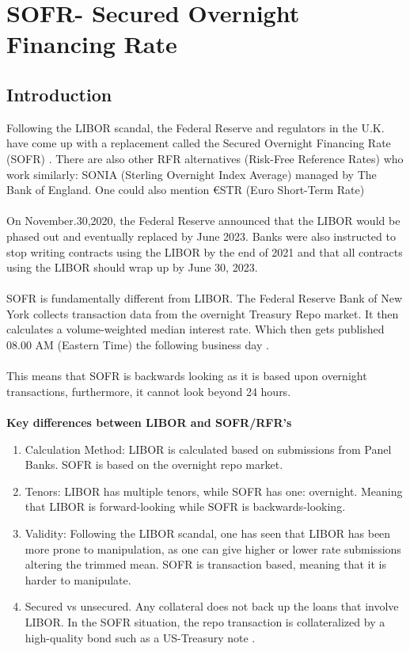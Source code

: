 \chapter{SOFR- Secured Overnight Financing Rate}
\label{chp_SOFR}

\section{Introduction}
Following the LIBOR scandal, the Federal Reserve and regulators in the U.K. have come up with a replacement called the Secured Overnight Financing Rate (SOFR) .
There are also other RFR alternatives (Risk-Free Reference Rates)  who work similarly: SONIA (Sterling Overnight Index Average) 
 managed by The Bank of England. One could also mention €STR (Euro Short-Term Rate) 
\cite{CME_SOFR}
\\~\\
On November.30,2020, the Federal Reserve announced that the LIBOR would be phased out and eventually replaced by June 2023. Banks were also instructed to stop writing contracts using the LIBOR by the end of 2021 and that all contracts using the LIBOR should wrap up by June 30, 2023. \cite{hayes_2022}
\\~\\ 
SOFR is fundamentally different from LIBOR. The Federal Reserve Bank of New York collects transaction data from the overnight Treasury Repo market. It then calculates a volume-weighted median interest rate. Which then gets published 08.00 AM (Eastern Time) the following business day \cite{ARRC_SOFR}.
\\~\\ 
This means that SOFR is backwards looking as it is based upon overnight transactions, furthermore, it cannot look beyond 24 hours.  
\\~\\
\textbf{Key differences between LIBOR and SOFR/RFR's}

\begin{enumerate}
    \item Calculation Method: LIBOR is calculated based on submissions from Panel Banks. SOFR is based on the overnight repo market. 
    \item Tenors: LIBOR has multiple tenors, while SOFR has one: overnight. Meaning that LIBOR is forward-looking while SOFR is backwards-looking. 
    \item Validity: Following the LIBOR scandal, one has seen that LIBOR has been more prone to manipulation, as one can give higher or lower rate submissions altering the trimmed mean. SOFR is transaction based, meaning that it is harder to manipulate. 
    \item Secured vs unsecured. Any collateral does not back up the loans that involve LIBOR. In the SOFR situation, the repo transaction is collateralized by a high-quality bond such as a US-Treasury note \cite{huggins2022sofr}. 
\end{enumerate}

